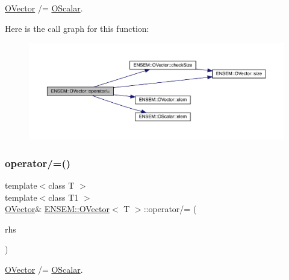 \mbox{\hyperlink{classENSEM_1_1OVector}{O\+Vector}} /= \mbox{\hyperlink{classENSEM_1_1OScalar}{O\+Scalar}}. 

Here is the call graph for this function\+:
\nopagebreak
\begin{figure}[H]
\begin{center}
\leavevmode
\includegraphics[width=350pt]{d0/d8d/classENSEM_1_1OVector_aa26be39a0620d0cdc1685bc2f1cc31a5_cgraph}
\end{center}
\end{figure}
\mbox{\label{classENSEM_1_1OVector_aa26be39a0620d0cdc1685bc2f1cc31a5}} 
\subsubsection{\texorpdfstring{operator/=()}{operator/=()}\hspace{0.1cm}{\footnotesize\ttfamily [2/6]}}
{\footnotesize\ttfamily template$<$class T $>$ \\
template$<$class T1 $>$ \\
\mbox{\hyperlink{classENSEM_1_1OVector}{O\+Vector}}\& \mbox{\hyperlink{classENSEM_1_1OVector}{E\+N\+S\+E\+M\+::\+O\+Vector}}$<$ T $>$\+::operator/= (\begin{DoxyParamCaption}\item[{const \mbox{\hyperlink{classENSEM_1_1OScalar}{O\+Scalar}}$<$ T1 $>$ \&}]{rhs }\end{DoxyParamCaption})\hspace{0.3cm}{\ttfamily [inline]}}



\mbox{\hyperlink{classENSEM_1_1OVector}{O\+Vector}} /= \mbox{\hyperlink{classENSEM_1_1OScalar}{O\+Scalar}}. 

